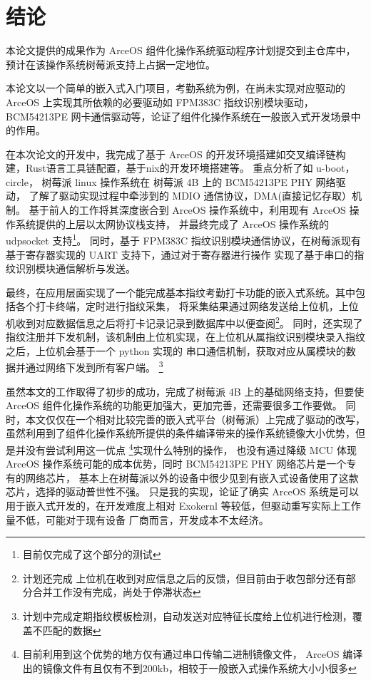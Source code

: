 \section{结论}

本论文提供的成果作为 ArceOS 组件化操作系统驱动程序计划提交到主仓库中，预计在该操作系统树莓派支持上占据一定地位。

本论文以一个简单的嵌入式入门项目，考勤系统为例，在尚未实现对应驱动的 ArceOS 上实现其所依赖的必要驱动如 
FPM383C 指纹识别模块驱动，BCM54213PE 网卡通信驱动等，论证了组件化操作系统在一般嵌入式开发场景中的作用。

在本次论文的开发中，我完成了基于 ArceOS 的开发环境搭建如交叉编译链构建，Rust语言工具链配置，基于nix的开发环境搭建等。
重点分析了如 u-boot， circle， 树莓派 linux 操作系统在 树莓派 4B 上的 BCM54213PE PHY 网络驱动，
了解了驱动实现过程中牵涉到的 MDIO 通信协议，DMA(直接记忆存取）机制。
基于前人的工作将其深度嵌合到 ArceOS 操作系统中，利用现有 ArceOS 操作系统提供的上层以太网协议栈支持，
并最终完成了 ArceOS 操作系统的 udpsocket 支持\footnote{目前仅完成了这个部分的测试}。
同时，基于 FPM383C 指纹识别模块通信协议，在树莓派现有基于寄存器实现的 UART 支持下，通过对于寄存器进行操作
实现了基于串口的指纹识别模块通信解析与发送。

最终，在应用层面实现了一个能完成基本指纹考勤打卡功能的嵌入式系统。其中包括各个打卡终端，定时进行指纹采集，
将采集结果通过网络发送给上位机，上位机收到对应数据信息之后将打卡记录记录到数据库中以便查阅\footnote{计划还完成
上位机在收到对应信息之后的反馈，但目前由于收包部分还有部分合并工作没有完成，尚处于停滞状态}。
同时，还实现了指纹注册并下发机制，该机制由上位机实现，在上位机从属指纹识别模块录入指纹之后，上位机会基于一个 python 实现的
串口通信机制，获取对应从属模块的数据并通过网络下发到所有客户端。
\footnote{计划中完成定期指纹模板检测，自动发送对应特征长度给上位机进行检测，覆盖不匹配的数据}

虽然本文的工作取得了初步的成功，完成了树莓派 4B 上的基础网络支持，但要使 ArceOS 组件化操作系统的功能更加强大，更加完善，还需要很多工作要做。
同时，本文仅仅在一个相对比较完善的嵌入式平台（树莓派）上完成了驱动的改写，
虽然利用到了组件化操作系统所提供的条件编译带来的操作系统镜像大小优势，但是并没有尝试利用这一优点
\footnote{目前利用到这个优势的地方仅有通过串口传输二进制镜像文件，
ArceOS 编译出的镜像文件有且仅有不到200kb，相较于一般嵌入式操作系统大小小很多}实现什么特别的操作，
也没有通过降级 MCU 体现 ArceOS 操作系统可能的成本优势，同时 BCM54213PE PHY 网络芯片是一个专有的网络芯片，
基本上在树莓派以外的设备中很少见到有嵌入式设备使用了这款芯片，选择的驱动普世性不强。
只是我的实现，论证了确实 ArceOS 系统是可以
用于嵌入式开发的，在开发难度上相对 Exokernl 等较低，但驱动重写实际上工作量不低，可能对于现有设备
厂商而言，开发成本不太经济。
